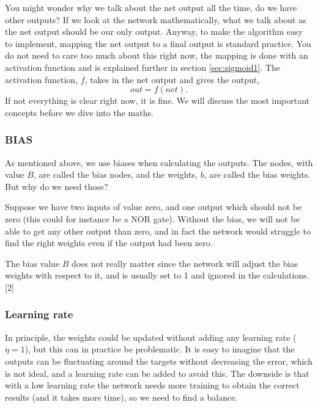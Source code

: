 You might wonder why we talk about the net output all the time, do we have other outputs? If we look at the network mathematically, what we talk about as the net output should be our only output. Anyway, to make the algorithm easy to implement, mapping the net output to a final output is standard practice. You do not need to care too much about this right now, the mapping is done with an activation function and is explained further in section \ref{sec:sigmoid1}. The activation function, $f$, takes in the net output and gives the output, 
\begin{equation}
out = f(net).
\end{equation}
If not everything is clear right now, it is fine. We will discuss the most important concepts before we dive into the maths.

\subsubsection{BIAS}
As mentioned above, we use biases when calculating the outputs. The nodes, with value $B$, are called the bias nodes, and the weights, $b$, are called the bias weights. But why do we need those? 

Suppose we have two inputs of value zero, and one output which should not be zero (this could for instance be a NOR gate). Without the bias, we will not be able to get any other output than zero, and in fact the network would struggle to find the right weights even if the output had been zero. 

The bias value $B$ does not really matter since the network will adjust the bias weights with respect to it, and is usually set to 1 and ignored in the calculations. [2]

\subsubsection{Learning rate}
In principle, the weights could be updated without adding any learning rate ($\eta=1$), but this can in practice be problematic. It is easy to imagine that the outputs can be fluctuating around the targets without decreasing the error, which is not ideal, and a learning rate can be added to avoid this. The downside is that with a low learning rate the network needs more training to obtain the correct results (and it takes more time), so we need to find a balance. 

